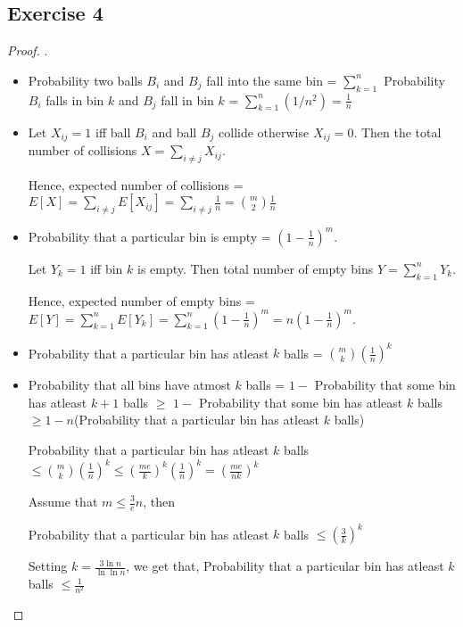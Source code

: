 \documentclass[12pt]{article}
\begin{document}
\subsection*{Exercise 4}
\begin{proof}.

\begin{itemize}
    \item Probability two balls $B_i$ and $B_j$ fall into the same bin = $\sum_{k=1}^n$ Probability $B_i$ falls in bin $k$ and $B_j$ fall in bin $k$  = $\sum_{k=1}^n (1/n^2) = \boxed{\frac{1}{n}}$
    
    \item Let $X_{ij} = 1$ iff ball $B_i$ and ball $B_j$ collide otherwise $X_{ij} = 0$. Then the total number of collisions $X = \sum_{i \neq j} X_{ij}$. 
    
    Hence, expected number of collisions = $E[X] = \sum_{i \neq j} E[X_{ij}] = \sum_{i \neq j} \frac{1}{n} = \boxed{{m \choose 2} \frac{1}{n}}$
    
    \item Probability that a particular bin is empty = $\boxed{\left(1-\frac{1}{n}\right)^m}$. 
    
    Let $Y_k = 1$ iff bin $k$ is empty. Then total number of empty bins $Y = \sum_{k=1}^n Y_k$. 
    
    Hence, expected number of empty bins = $E[Y] = \sum_{k=1}^n E[Y_k] = \sum_{k=1}^n (1-\frac{1}{n})^m = \boxed{n\left(1-\frac{1}{n}\right)^m}$.
    
    \item Probability that a particular bin has atleast $k$ balls = $\boxed{{m \choose k} \left(\frac{1}{n}\right)^k}$
    
    \item Probability that all bins have atmost $k$ balls = $1 -$ Probability that some bin has atleast $k+1$ balls $\geq$ $1 -$ Probability that some bin has atleast $k$ balls $\geq 1 - n$(Probability that a particular bin has atleast $k$ balls) 
    
    Probability that a particular bin has atleast $k$ balls $\leq {m \choose k} (\frac{1}{n})^k \leq \left(\frac{me}{k}\right)^{k} \left(\frac{1}{n}\right)^{k} = \left(\frac{me}{nk}\right)^{k}$
    
    Assume that $\boxed{m \leq \frac{3}{e} n}$, then 
    
    Probability that a particular bin has atleast $k$ balls $\leq \left(\frac{3}{k}\right)^{k}$
    
    Setting $k = \frac{3\ln n}{\ln \ln n}$, we get that, Probability that a particular bin has atleast $k$ balls $\leq \frac{1}{n^2}$
    

\end{itemize}
\end{proof}
\end{document}
